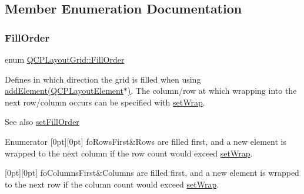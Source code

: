 \subsection{Member Enumeration Documentation}
\mbox{\label{class_q_c_p_layout_grid_a7d49ee08773de6b2fd246edfed353cca}} 
\subsubsection{\texorpdfstring{Fill\+Order}{FillOrder}}
{\footnotesize\ttfamily enum \hyperlink{class_q_c_p_layout_grid_a7d49ee08773de6b2fd246edfed353cca}{Q\+C\+P\+Layout\+Grid\+::\+Fill\+Order}}

Defines in which direction the grid is filled when using \hyperlink{class_q_c_p_layout_grid_a4c44025dd25acd27e053cadfd448ad7b}{add\+Element(\+Q\+C\+P\+Layout\+Element$\ast$)}. The column/row at which wrapping into the next row/column occurs can be specified with \hyperlink{class_q_c_p_layout_grid_ab36af18d77e4428386d02970382ee598}{set\+Wrap}.

\begin{DoxySeeAlso}{See also}
\hyperlink{class_q_c_p_layout_grid_affc2f3cfd22f28698c5b29b960d2a391}{set\+Fill\+Order} 
\end{DoxySeeAlso}
\begin{DoxyEnumFields}{Enumerator}
[0pt][0pt]{}\mbox{\label{class_q_c_p_layout_grid_a7d49ee08773de6b2fd246edfed353ccaa0202730954e26c474cc820164aedce3e}} 
fo\+Rows\+First&Rows are filled first, and a new element is wrapped to the next column if the row count would exceed \hyperlink{class_q_c_p_layout_grid_ab36af18d77e4428386d02970382ee598}{set\+Wrap}. \\
\hline

[0pt][0pt]{}\mbox{\label{class_q_c_p_layout_grid_a7d49ee08773de6b2fd246edfed353ccaac4cb4b796ec4822d5894b47b51627fb3}} 
fo\+Columns\+First&Columns are filled first, and a new element is wrapped to the next row if the column count would exceed \hyperlink{class_q_c_p_layout_grid_ab36af18d77e4428386d02970382ee598}{set\+Wrap}. \\
\hline

\end{DoxyEnumFields}


